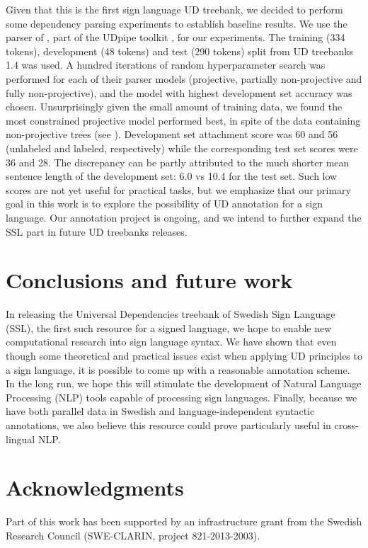 \documentclass[11pt]{article}
\begin{document}
Given that this is the first sign language UD treebank, we decided to perform
some dependency parsing experiments to establish baseline results.
We use the parser of , part of the UDpipe
toolkit \cite{Straka2016udpipe}, for our experiments. The training (334
tokens), development (48 tokens) and test (290 tokens) split from
UD treebanks 1.4 was used.
A hundred iterations of random hyperparameter search was performed for each of
their parser models (projective, partially non-projective and fully
non-projective), and the model with highest development set accuracy was
chosen.
Unsurprisingly given the small amount of training data, we found the most
constrained projective model performed best, in spite of the data containing
non-projective trees (see ).
Development set attachment score was 60 and 56 (unlabeled and labeled,
respectively) while the corresponding test set scores were 36 and
28. The discrepancy can be partly attributed to the much shorter mean
sentence length of the development set: 6.0 vs 10.4 for the test set.
Such low scores are not yet useful for practical tasks, but we emphasize that
our primary goal in this work is to explore the possibility of UD annotation
for a sign language. Our annotation project is ongoing, and we intend to
further expand the SSL part in future UD treebanks releases.

\section{Conclusions and future work}

In releasing the Universal Dependencies treebank of Swedish Sign Language
(SSL), the first such resource for a signed language,
we hope to enable new computational research into sign language syntax.
We have shown that even though some theoretical and practical issues exist
when applying UD principles to a sign language, it is possible to come up with
a reasonable annotation scheme. In the long run, we hope this will
stimulate the development of Natural
Language Processing (NLP) tools capable of processing sign languages.
Finally, because we have both parallel data in Swedish and language-independent
syntactic annotations, we also believe this resource could prove particularly
useful in cross-lingual NLP.


\section*{Acknowledgments}

Part of this work has been supported by an infrastructure grant from the
Swedish Research Council (SWE-CLARIN, project 821-2013-2003).




\end{document}
